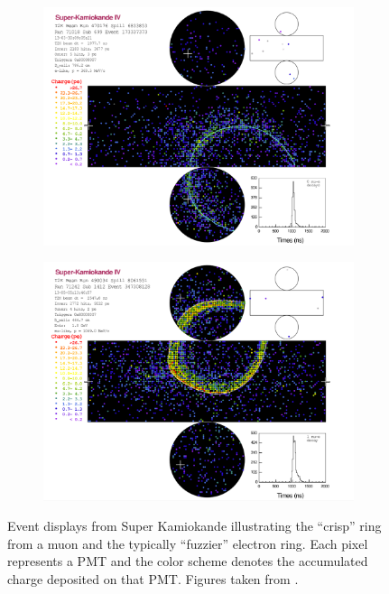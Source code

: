 \begin{figure}[h]
  \begin{subfigure}[t]{0.5\textwidth}
    \includegraphics[width=\textwidth, trim={0mm 0mm 0mm 0mm}, clip,page=1]{Figures/Selections/NuECandidate.pdf}
  \end{subfigure}%
  \begin{subfigure}[t]{0.5\textwidth}
    \includegraphics[width=\textwidth, trim={0mm 0mm 0mm 0mm}, clip,page=1]{Figures/Selections/NuMuCandidate.pdf}
    \subcaption{\quickmath{\nu_{\mu}}}
  \end{subfigure}
  \caption{Event displays from Super Kamiokande illustrating the ``crisp'' ring from a muon and the typically ``fuzzier'' electron ring. Each pixel represents a PMT and the color scheme denotes the accumulated charge deposited on that PMT. Figures taken from \cite{t2k_tn_219}.}
  \label{fig:Selection_SKEventDisplays}
\end{figure}

